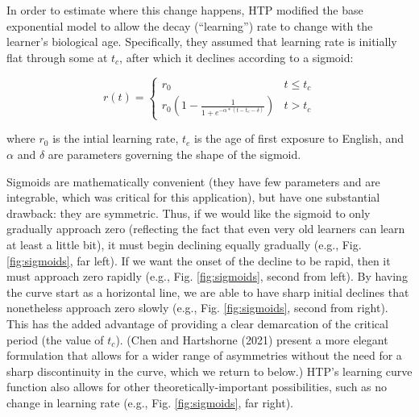 \documentclass[
  english,
  doc,floatsintext]{apa6}
\begin{document}
In order to estimate where this change happens, HTP modified the base exponential model to allow the decay (``learning'') rate to change with the learner's biological age. Specifically, they assumed that learning rate is initially flat through some at \(t_c\), after which it declines according to a sigmoid:

\[r(t) = \begin{cases} r_0 & t \leq t_c  \\ r_0(1 - \frac{1}{1+e^{-\alpha*(t - t_e - \delta)}}) & t > t_c
    \end{cases}\]

\noindent where \(r_0\) is the intial learning rate, \(t_e\) is the age of first exposure to English, and \(\alpha\) and \(\delta\) are parameters governing the shape of the sigmoid.

Sigmoids are mathematically convenient (they have few parameters and are integrable, which was critical for this application), but have one substantial drawback: they are symmetric. Thus, if we would like the sigmoid to only gradually approach zero (reflecting the fact that even very old learners can learn at least a little bit), it must begin declining equally gradually (e.g., Fig. \ref{fig:sigmoids}, far left). If we want the onset of the decline to be rapid, then it must approach zero rapidly (e.g., Fig. \ref{fig:sigmoids}, second from left). By having the curve start as a horizontal line, we are able to have sharp initial declines that nonetheless approach zero slowly (e.g., Fig. \ref{fig:sigmoids}, second from right). This has the added advantage of providing a clear demarcation of the critical period (the value of \(t_c\)). (Chen and Hartshorne (2021) present a more elegant formulation that allows for a wider range of asymmetries without the need for a sharp discontinuity in the curve, which we return to below.) HTP's learning curve function also allows for other theoretically-important possibilities, such as no change in learning rate (e.g., Fig. \ref{fig:sigmoids}, far right).
\end{document}
